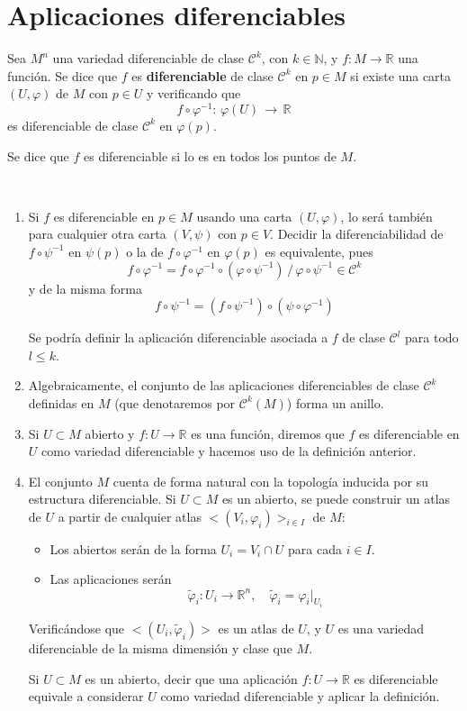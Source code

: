 \section{Aplicaciones diferenciables}
\begin{defi}
Sea $M^n$ una variedad diferenciable de clase $\mathcal{C}^k$, con $k \in \mathbb{N}$, y $f: M \to \mathbb{R}$ una función. Se dice que $f$ es \textbf{diferenciable} de clase $\mathcal{C}^k$ en $p \in M$ si existe una carta $(U,\varphi)$ de $M$ con $p \in U$ y verificando que $$f \circ \varphi^{-1}:\,\varphi(U) \,\longrightarrow \, \mathbb{R}$$es diferenciable de clase $\mathcal{C}^k$ en $\varphi(p)$.

Se dice que $f$ es diferenciable si lo es en todos los puntos de $M$.
\end{defi} 
\begin{obss}\, 
\begin{enumerate}
\item Si $f$ es diferenciable en $p \in M$ usando una carta $(U,\varphi)$, lo será también para cualquier otra carta $(V,\psi)$ con $p \in V$. Decidir la diferenciabilidad de $f \circ \psi^{-1}$ en $\psi(p)$ o  la de $f \circ \varphi^{-1}$ en $\varphi(p)$ es equivalente, pues
$$f\circ \varphi^{-1}=f \circ \varphi^{-1}\circ(\varphi \circ \psi^{-1}) \, / \, \varphi \circ \psi^{-1} \in \mathcal{C}^k$$ 
y de la misma forma
$$f\circ \psi^{-1}=(f \circ \psi^{-1})\circ(\psi \circ \varphi^{-1}) $$

Se podría definir la aplicación diferenciable asociada a $f$ de clase $\mathcal{C}^l$ para todo $l \leq k$.
\item Algebraicamente, el conjunto de las aplicaciones diferenciables de clase $\mathcal{C}^k$ definidas en $M$ (que denotaremos por $\mathcal{C}^k(M)$) forma un anillo.
\item
    Si $U \subset M$ abierto y $f: U \longrightarrow \mathbb R$ es una funci\'on, diremos que $f$ es diferenciable en $U$ como variedad diferenciable y hacemos uso de la definici\'on anterior.
\item
El conjunto $M$ cuenta de forma natural con la topología inducida por su estructura diferenciable. Si $U \subset M$ es un abierto, se puede construir un atlas de $U$ a partir de cualquier atlas $<(V_i,\varphi_i)>_{i\in I}$ de $M$:\begin{itemize}
    \item Los abiertos serán de la forma $U_i = V_i \cap U$ para cada $i \in I$.
    \item Las aplicaciones serán $$\tilde{\varphi}_i: U_i \longrightarrow \mathbb{R}^n,\quad \tilde{\varphi}_i = \varphi_i|_{U_i}$$
\end{itemize}
Verificándose que $<(U_i,\tilde{\varphi}_i)>$ es un atlas de $U$, y $U$ es una variedad diferenciable de la misma dimensión y clase que $M$.

Si $U \subset M$ es un abierto, decir que una aplicación $f:U \to \mathbb{R}$ es diferenciable equivale a considerar $U$ como variedad diferenciable y aplicar la definición.
\end{enumerate}
\end{obss}

